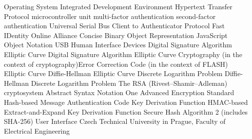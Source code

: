       {Operating System}
     {Integrated Development Environment}
    {Hypertext Transfer Protocol}
     {microcontroller unit}
     {multi-factor authentication}
     {second-factor authentication}
     {Universal Serial Bus}
    {Client to Authenticator Protocol}
    {Fast IDentity Online Alliance}
    {Concise Binary Object Representation}
    {JavaScript Object Notation}
     {USB Human Interface Devices}
     {Digital Signature Algorithm}
   {Elliptic Curve Digital Signature Algorithm}
     {Elliptic Curve Cryptography (in the context of cryptography){\nl}Error Correction Code (in the context of FLASH)}
    {Elliptic Curve Diffie-Hellman}
   {Elliptic Curve Discrete Logarithm Problem}
      {Diffie-Hellman}
     {Discrete Logarithm Problem}
     {The RSA (Rivest–Shamir–Adleman) cryptosystem}
   {Abstract Syntax Notation One}
     {Advanced Encryption Standard}
    {Hash-based Message Authentication Code}
     {Key Derivation Function}
    {HMAC-based Extract-and-Expand Key Derivation Function}
   {Secure Hash Algorithm 2 (includes SHA-256)}
      {User Interface}
 {Czech Technical University in Prague, Faculty of Electrical Engineering}
